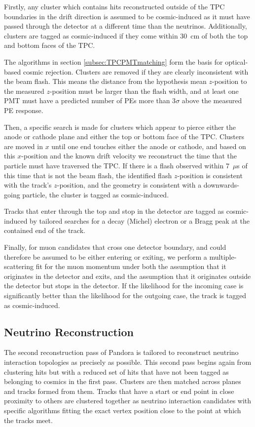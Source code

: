 \documentclass[%
twocolumn,
 amsmath,amssymb,
 aps,
prd,
superscriptaddress,showpacs]{revtex4-2}
\begin{document}
Firstly, any cluster which contains hits reconstructed outside of the TPC boundaries in the drift direction is assumed to be cosmic-induced as it must have passed through the detector at a different time than the neutrinos.
Additionally, clusters are tagged as cosmic-induced if they come within 30~cm of both the top and bottom faces of the TPC.

The algorithms in section \ref{subsec:TPCPMTmatching} form the basis for optical-based cosmic rejection.
Clusters are removed if they are clearly inconsistent with the beam flash.  This means the distance from the hypothesis mean $z$-position to the measured $z$-position must be larger than the flash width, and at least one PMT must have a predicted number of PEs more than 3$\sigma$ above the measured PE response.

Then, a specific search is made for clusters which appear to pierce either the anode or cathode plane and either the top or bottom face of the TPC.
Clusters are moved in $x$ until one end touches either the anode or cathode, and based on this $x$-position and the known drift velocity we reconstruct the time that the particle must have traversed the TPC.
If there is a flash observed within 7~$\mu$s of this time that is not the beam flash, the identified flash $z$-position is consistent with the track's $z$-position, and the geometry is consistent with a downwards-going particle, the cluster is tagged as cosmic-induced.

Tracks that enter through the top and stop in the detector are tagged as cosmic-induced by tailored searches for a decay (Michel) electron or a Bragg peak at the contained end of the track.

Finally, for muon candidates that cross one detector boundary, and could therefore be assumed to be either entering or exiting, we perform a multiple-scattering fit for the muon momentum under both the assumption that it originates in the detector and exits, and the assumption that it originates outside the detector but stops in the detector.
If the likelihood for the incoming case is significantly better than the likelihood for the outgoing case, the track is tagged as cosmic-induced.


\subsection{Neutrino Reconstruction} 
The second reconstruction pass of Pandora is tailored to reconstruct neutrino interaction topologies as precisely as possible.
This second pass begins again from clustering hits but with a reduced set of hits that have not been tagged as belonging to cosmics in the first pass.
Clusters are then matched across planes and tracks formed from them.
Tracks that have a start or end point in close proximity to others are clustered together as neutrino interaction candidates with specific algorithms fitting the exact vertex position close to the point at which the tracks meet.
\end{document}
